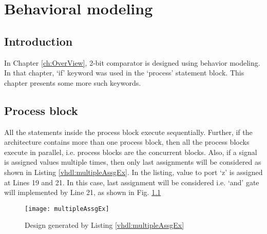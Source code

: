 \chapter{Behavioral modeling} \label{ch:behavioralModeling}

\graphicspath{{Chapters/BehavioralModeling/Figures/}}


%

\section{Introduction}
In Chapter \ref{ch:OverView}, 2-bit comparator is designed using behavior modeling. In that chapter, `if' keyword was used in the `process' statement block. This chapter presents some more such keywords. 

\section{Process block}
All the statements inside the process block execute sequentially. Further, if the architecture contains more than one process block, then all the process blocks execute in parallel, i.e. process blocks are the concurrent blocks. Also, if a signal is assigned values multiple times, then only last assignments will be considered as shown in Listing \ref{vhdl:multipleAssgEx}. In the listing, value to port `z' is assigned at Lines 19 and 21. In this case, last assignment will be considered i.e. `and' gate will implemented by Line 21, as shown in Fig. \ref{fig:multipleAssgEx}



\begin{figure}
	\centering
	\texttt{[image: multipleAssgEx]}
	\caption{Design generated by Listing \ref{vhdl:multipleAssgEx}}
	\label{fig:multipleAssgEx}
\end{figure}

